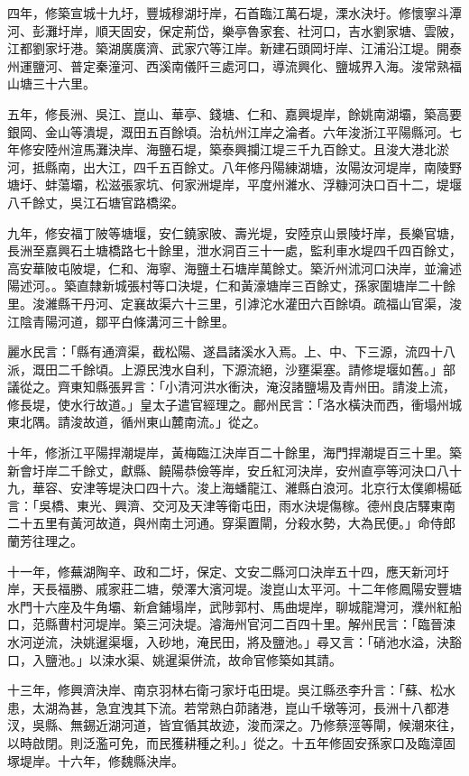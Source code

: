 四年，修築宣城十九圩，豐城穆湖圩岸，石首臨江萬石堤，溧水決圩。修懷寧斗潭河、彭灘圩岸，順天固安，保定荊岱，樂亭魯家套、社河口，吉水劉家塘、雲陂，江都劉家圩港。築湖廣廣濟、武家穴等江岸。新建石頭岡圩岸、江浦沿江堤。開泰州運鹽河、普定秦潼河、西溪南儀阡三處河口，導流興化、鹽城界入海。浚常熟福山塘三十六里。

五年，修長洲、吳江、崑山、華亭、錢塘、仁和、嘉興堤岸，餘姚南湖壩，築高要銀岡、金山等潰堤，溉田五百餘頃。治杭州江岸之淪者。六年浚浙江平陽縣河。七年修安陸州渲馬灘決岸、海鹽石堤，築泰興攔江堤三千九百餘丈。且浚大港北淤河，抵縣南，出大江，四千五百餘丈。八年修丹陽練湖塘，汝陽汝河堤岸，南陵野塘圩、蚌蕩壩，松滋張家坑、何家洲堤岸，平度州濰水、浮糠河決口百十二，堤堰八千餘丈，吳江石塘官路橋梁。

九年，修安福丁陂等塘堰，安仁鐃家陂、壽光堤，安陸京山景陵圩岸，長樂官塘，長洲至嘉興石土塘橋路七十餘里，泄水洞百三十一處，監利車水堤四千四百餘丈，高安華陂屯陂堤，仁和、海寧、海鹽土石塘岸萬餘丈。築沂州沭河口決岸，並瀹述陽述河。。築直隸新城張村等口決堤，仁和黃濠塘岸三百餘丈，孫家圍塘岸二十餘里。浚濰縣干丹河、定襄故渠六十三里，引滹沱水灌田六百餘頃。疏福山官渠，浚江陰青陽河道，鄒平白條溝河三十餘里。

麗水民言：「縣有通濟渠，截松陽、遂昌諸溪水入焉。上、中、下三源，流四十八派，溉田二千餘頃。上源民洩水自利，下源流絕，沙壅渠塞。請修堤堰如舊。」部議從之。齊東知縣張昇言：「小清河洪水衝決，淹沒諸鹽場及青州田。請浚上流，修長堤，使水行故道。」皇太子遣官經理之。鄜州民言：「洛水橫決而西，衝塌州城東北隅。請浚故道，循州東山麓南流。」從之。

十年，修浙江平陽捍潮堤岸，黃梅臨江決岸百二十餘里，海門捍潮堤百三十里。築新會圩岸二千餘丈，獻縣、饒陽恭儉等岸，安丘紅河決岸，安州直亭等河決口八十九，華容、安津等堤決口四十六。浚上海蟠龍江、濰縣白浪河。北京行太僕卿楊砥言：「吳橋、東光、興濟、交河及天津等衛屯田，雨水決堤傷稼。德州良店驛東南二十五里有黃河故道，與州南土河通。穿渠置閘，分殺水勢，大為民便。」命侍郎蘭芳往理之。

十一年，修蕪湖陶辛、政和二圩，保定、文安二縣河口決岸五十四，應天新河圩岸，天長福勝、戚家莊二塘，滎澤大濱河堤。浚崑山太平河。十二年修鳳陽安豐塘水門十六座及牛角壩、新倉鋪塌岸，武陟郭村、馬曲堤岸，聊城龍灣河，濮州紅船口，范縣曹村河堤岸。築三河決堤。濬海州官河二百四十里。解州民言：「臨晉涑水河逆流，決姚暹渠堰，入砂地，淹民田，將及鹽池。」尋又言：「硝池水溢，決豁口，入鹽池。」以涑水渠、姚暹渠併流，故命官修築如其請。

十三年，修興濟決岸、南京羽林右衛刁家圩屯田堤。吳江縣丞李升言：「蘇、松水患，太湖為甚，急宜洩其下流。若常熟白茆諸港，崑山千墩等河，長洲十八都港汊，吳縣、無錫近湖河道，皆宜循其故迹，浚而深之。乃修蔡涇等閘，候潮來往，以時啟閉。則泛濫可免，而民獲耕種之利。」從之。十五年修固安孫家口及臨漳固塚堤岸。十六年，修魏縣決岸。

